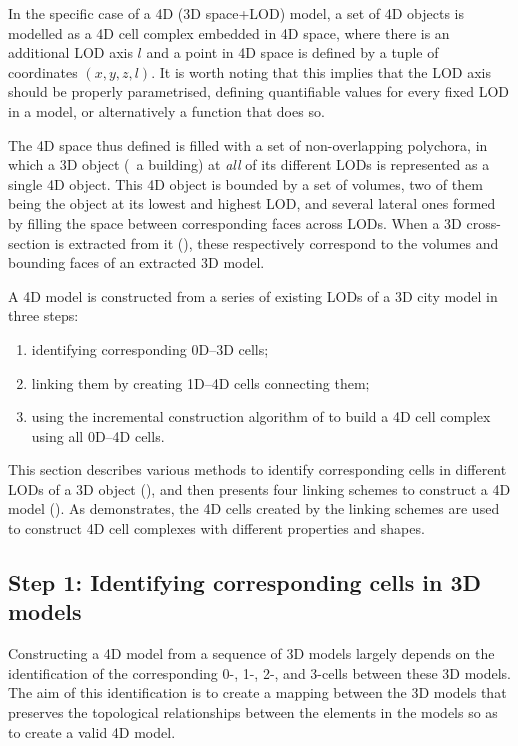 In the specific case of a 4D (3D space+LOD) model, a set of 4D objects is modelled as a 4D cell complex embedded in 4D space, where there is an additional LOD axis $l$ and a point in 4D space is defined by a tuple of coordinates $(x,y,z,l)$.
It is worth noting that this implies that the LOD axis should be properly parametrised, defining quantifiable values for every fixed LOD in a model, or alternatively a function that does so.

The 4D space thus defined is filled with a set of non-overlapping polychora, in which a 3D object (\eg\ a building) at \emph{all} of its different LODs is represented as a single 4D object.
This 4D object is bounded by a set of volumes, two of them being the object at its lowest and highest LOD, and several lateral ones formed by filling the space between corresponding faces across LODs.
When a 3D cross-section is extracted from it (), these respectively correspond to the volumes and bounding faces of an extracted 3D model.

A 4D model is constructed from a series of existing LODs of a 3D city model in three steps: 
\begin{enumerate}
  \item identifying corresponding 0D--3D cells;
  \item linking them by creating 1D--4D cells connecting them;
  \item using the incremental construction algorithm of  to build a 4D cell complex using all 0D--4D cells.
\end{enumerate}

This section describes various methods to identify corresponding cells in different LODs of a 3D object (), and then presents four linking schemes to construct a 4D model ().
As  demonstrates, the 4D cells created by the linking schemes are used to construct 4D cell complexes with different properties and shapes.

\subsection{Step 1: Identifying corresponding cells in 3D models}
\label{ss:identification}

Constructing a 4D model from a sequence of 3D models largely depends on the identification of the corresponding 0-, 1-, 2-, and 3-cells between these 3D models.
The aim of this identification is to create a mapping between the 3D models that preserves the topological relationships between the elements in the models so as to create a valid 4D model.

